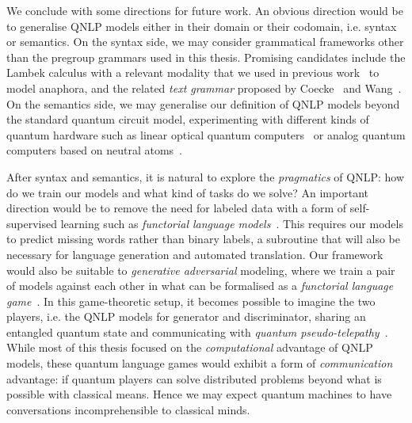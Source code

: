 We conclude with some directions for future work.
An obvious direction would be to generalise QNLP models either in their domain or their codomain, i.e. syntax or semantics.
On the syntax side, we may consider grammatical frameworks other than the pregroup grammars used in this thesis.
Promising candidates include the Lambek calculus with a relevant modality that we used in previous work~\cite{McPheatEtAl21} to model anaphora, and the related \emph{text grammar} proposed by Coecke~\cite{Coecke21} and Wang~\cite{CoeckeWang21}.
On the semantics side, we may generalise our definition of QNLP models beyond the standard quantum circuit model, experimenting with different kinds of quantum hardware such as linear optical quantum computers~\cite{KokEtAl07} or analog quantum computers based on neutral atoms~\cite{HenrietEtAl20}.

After syntax and semantics, it is natural to explore the \emph{pragmatics} of QNLP: how do we train our models and what kind of tasks do we solve?
An important direction would be to remove the need for labeled data with a form of self-supervised learning such as \emph{functorial language models}~\cite{ToumiKoziell-Pipe21}.
This requires our models to predict missing words rather than binary labels, a subroutine that will also be necessary for language generation and automated translation.
Our framework would also be suitable to \emph{generative adversarial} modeling, where we train a pair of models against each other in what can be formalised as a \emph{functorial language game}~\cite{FeliceEtAl20}.
In this game-theoretic setup, it becomes possible to imagine the two players, i.e. the QNLP models for generator and discriminator, sharing an entangled quantum state and communicating with \emph{quantum pseudo-telepathy}~\cite{BrassardEtAl05}.
While most of this thesis focused on the \emph{computational} advantage of QNLP models, these quantum language games would exhibit a form of \emph{communication} advantage: if quantum players can solve distributed problems beyond what is possible with classical means.
Hence we may expect quantum machines to have conversations incomprehensible to classical minds.
